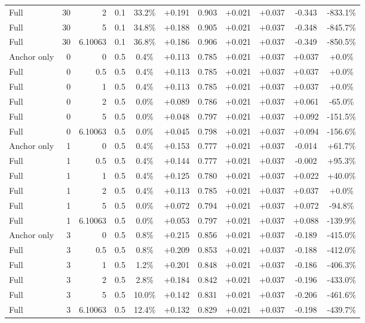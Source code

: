 \begin{table}[htbp]
\begin{tabular}{lrrrccccccc}
Full & 30 & 2 & 0.1 & 33.2\% & +0.191 & 0.903 & +0.021 & +0.037 & -0.343 & -833.1\% \\
Full & 30 & 5 & 0.1 & 34.8\% & +0.188 & 0.905 & +0.021 & +0.037 & -0.348 & -845.7\% \\
Full & 30 & 6.10063 & 0.1 & 36.8\% & +0.186 & 0.906 & +0.021 & +0.037 & -0.349 & -850.5\% \\
Anchor only & 0 & 0 & 0.5 & 0.4\% & +0.113 & 0.785 & +0.021 & +0.037 & +0.037 & +0.0\% \\
Full & 0 & 0.5 & 0.5 & 0.4\% & +0.113 & 0.785 & +0.021 & +0.037 & +0.037 & +0.0\% \\
Full & 0 & 1 & 0.5 & 0.4\% & +0.113 & 0.785 & +0.021 & +0.037 & +0.037 & +0.0\% \\
Full & 0 & 2 & 0.5 & 0.0\% & +0.089 & 0.786 & +0.021 & +0.037 & +0.061 & -65.0\% \\
Full & 0 & 5 & 0.5 & 0.0\% & +0.048 & 0.797 & +0.021 & +0.037 & +0.092 & -151.5\% \\
Full & 0 & 6.10063 & 0.5 & 0.0\% & +0.045 & 0.798 & +0.021 & +0.037 & +0.094 & -156.6\% \\
Anchor only & 1 & 0 & 0.5 & 0.4\% & +0.153 & 0.777 & +0.021 & +0.037 & -0.014 & +61.7\% \\
Full & 1 & 0.5 & 0.5 & 0.4\% & +0.144 & 0.777 & +0.021 & +0.037 & -0.002 & +95.3\% \\
Full & 1 & 1 & 0.5 & 0.4\% & +0.125 & 0.780 & +0.021 & +0.037 & +0.022 & +40.0\% \\
Full & 1 & 2 & 0.5 & 0.4\% & +0.113 & 0.785 & +0.021 & +0.037 & +0.037 & +0.0\% \\
Full & 1 & 5 & 0.5 & 0.0\% & +0.072 & 0.794 & +0.021 & +0.037 & +0.072 & -94.8\% \\
Full & 1 & 6.10063 & 0.5 & 0.0\% & +0.053 & 0.797 & +0.021 & +0.037 & +0.088 & -139.9\% \\
Anchor only & 3 & 0 & 0.5 & 0.8\% & +0.215 & 0.856 & +0.021 & +0.037 & -0.189 & -415.0\% \\
Full & 3 & 0.5 & 0.5 & 0.8\% & +0.209 & 0.853 & +0.021 & +0.037 & -0.188 & -412.0\% \\
Full & 3 & 1 & 0.5 & 1.2\% & +0.201 & 0.848 & +0.021 & +0.037 & -0.186 & -406.3\% \\
Full & 3 & 2 & 0.5 & 2.8\% & +0.184 & 0.842 & +0.021 & +0.037 & -0.196 & -433.0\% \\
Full & 3 & 5 & 0.5 & 10.0\% & +0.142 & 0.831 & +0.021 & +0.037 & -0.206 & -461.6\% \\
Full & 3 & 6.10063 & 0.5 & 12.4\% & +0.132 & 0.829 & +0.021 & +0.037 & -0.198 & -439.7\% \\

\end{tabular}
\end{table}
